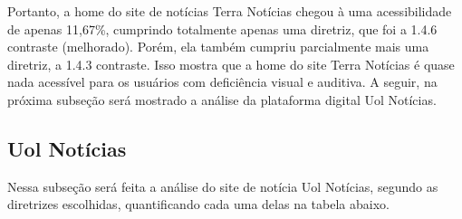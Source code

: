 \documentclass[a4paper]{article}
\begin{document}
\begin{titlepage}
Portanto, a home do site de notícias Terra Notícias chegou à uma acessibilidade de apenas 11,67\%, cumprindo totalmente apenas uma diretriz, que foi a 1.4.6 contraste (melhorado). Porém, ela também cumpriu parcialmente mais uma diretriz, a 1.4.3 contraste. Isso mostra que a home do site Terra Notícias é quase nada acessível para os usuários com deficiência visual e auditiva. A seguir, na próxima subseção será mostrado a análise da plataforma digital Uol Notícias.

\subsection{Uol Notícias}

Nessa subseção será feita a análise do site de notícia Uol Notícias, segundo as diretrizes escolhidas, quantificando cada uma delas na tabela abaixo.\\


\end{titlepage}
\end{document}
